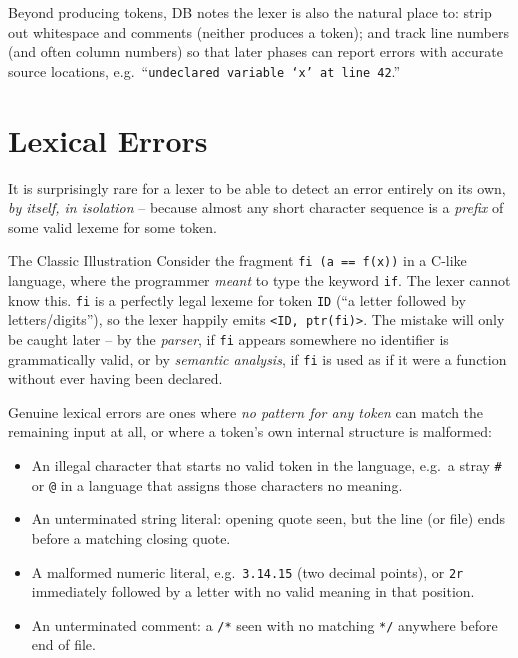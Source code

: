 \documentclass[full-course-notes.tex]{subfiles}
\begin{document}
\begin{coreidea}
Beyond producing tokens, DB notes the lexer is also the natural place to: strip out whitespace
and comments (neither produces a token); and track line numbers (and often column numbers) so
that later phases can report errors with accurate source locations, e.g.\ ``\texttt{undeclared
variable `x' at line 42}.''
\end{coreidea}

\section{Lexical Errors}
\label{sec:l3-lexical-errors}

\dbtag It is surprisingly rare for a lexer to be able to detect an error entirely on its own,
\emph{by itself, in isolation} -- because almost any short character sequence is a \emph{prefix}
of some valid lexeme for some token.

\begin{examplebox}{The Classic Illustration}
Consider the fragment \texttt{fi (a == f(x))} in a C-like language, where the programmer
\emph{meant} to type the keyword \texttt{if}. The lexer cannot know this. \texttt{fi} is a
perfectly legal lexeme for token \texttt{ID} (``a letter followed by letters/digits''), so the
lexer happily emits \texttt{<ID, ptr(fi)>}. The mistake will only be caught later -- by the
\emph{parser}, if \texttt{fi} appears somewhere no identifier is grammatically valid, or by
\emph{semantic analysis}, if \texttt{fi} is used as if it were a function without ever having
been declared.
\end{examplebox}

Genuine lexical errors are ones where \emph{no pattern for any token} can match the remaining
input at all, or where a token's own internal structure is malformed:

\begin{itemize}
  \item An illegal character that starts no valid token in the language, e.g.\ a stray
  \texttt{\#} or \texttt{@} in a language that assigns those characters no meaning.
  \item An unterminated string literal: opening quote seen, but the line (or file) ends before a
  matching closing quote.
  \item A malformed numeric literal, e.g.\ \texttt{3.14.15} (two decimal points), or
  \texttt{2r} immediately followed by a letter with no valid meaning in that position.
  \item An unterminated comment: a \texttt{/*} seen with no matching \texttt{*/} anywhere before
  end of file.
\end{itemize}
\end{document}
